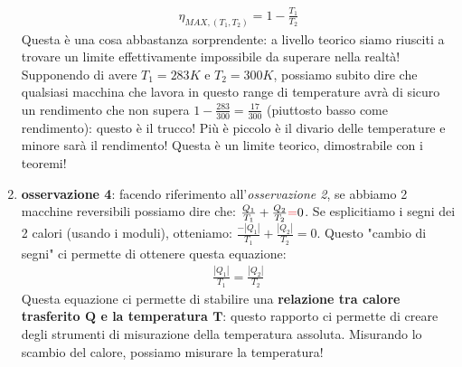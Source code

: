 \begin{enumerate}
                    \begin{align*}
                        \eta_{MAX, (T_1, T_2)} = 1-\frac{T_1}{T_2}
                    \end{align*}
                    Questa è una cosa abbastanza sorprendente: a livello teorico siamo riusciti a trovare un limite effettivamente impossibile da superare nella realtà! Supponendo di avere $T_1 = 283K$ e $T_2 = 300K$, possiamo subito dire che qualsiasi macchina che lavora in questo range di temperature avrà di sicuro un rendimento che non supera $1-\frac{283}{300} = \frac{17}{300}$ (piuttosto basso come rendimento): questo è il trucco! Più è piccolo è il divario delle temperature e minore sarà il rendimento! Questa è un limite teorico, dimostrabile con i teoremi!
                    \item \textbf{osservazione 4}: facendo riferimento all'\textit{osservazione 2}, se abbiamo 2 macchine reversibili possiamo dire che: $\frac{Q_1}{T_1}+ \frac{Q_2}{T_2} \textcolor{Red}{=} 0$. Se esplicitiamo i segni dei 2 calori (usando i moduli), otteniamo: $\frac{-|Q_1|}{T_1}+ \frac{|Q_2|}{T_2} = 0$. Questo "cambio di segni" ci permette di ottenere questa equazione:
                    \begin{align*}
                        \frac{|Q_1|}{T_1} = \frac{|Q_2|}{T_2}
                    \end{align*}
                    Questa equazione ci permette di stabilire una \textbf{relazione tra calore trasferito $\mathbf{Q}$ e la temperatura $\mathbf{T}$}: questo rapporto ci permette di creare degli strumenti di misurazione della temperatura assoluta. Misurando lo scambio del calore, possiamo misurare la temperatura!
                \end{enumerate}

